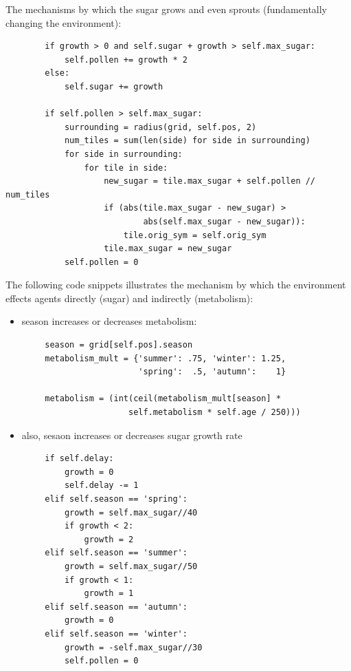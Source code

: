 \noindent
The mechanisms by which the sugar grows and even sprouts (fundamentally changing the environment):
\begin{verbatim}
        if growth > 0 and self.sugar + growth > self.max_sugar:
            self.pollen += growth * 2
        else:
            self.sugar += growth
            
        if self.pollen > self.max_sugar:
            surrounding = radius(grid, self.pos, 2)
            num_tiles = sum(len(side) for side in surrounding)
            for side in surrounding:
                for tile in side:
                    new_sugar = tile.max_sugar + self.pollen // num_tiles
                    if (abs(tile.max_sugar - new_sugar) > 
                            abs(self.max_sugar - new_sugar)):
                        tile.orig_sym = self.orig_sym                        
                    tile.max_sugar = new_sugar
            self.pollen = 0
\end{verbatim}

The following code snippets illustrates the mechanism by which the environment effects agents directly (sugar) and indirectly (metabolism):

\begin{itemize}
    \item season increases or decreases metabolism:
\end{itemize}
\begin{verbatim}
        season = grid[self.pos].season
        metabolism_mult = {'summer': .75, 'winter': 1.25, 
                           'spring':  .5, 'autumn':    1}
        
        metabolism = (int(ceil(metabolism_mult[season] * 
                         self.metabolism * self.age / 250)))
\end{verbatim}
\begin{itemize}
    \item also, sesaon increases or decreases sugar growth rate
\end{itemize}
\begin{verbatim}
        if self.delay:
            growth = 0
            self.delay -= 1            
        elif self.season == 'spring':
            growth = self.max_sugar//40
            if growth < 2:
                growth = 2
        elif self.season == 'summer': 
            growth = self.max_sugar//50 
            if growth < 1:
                growth = 1
        elif self.season == 'autumn':
            growth = 0
        elif self.season == 'winter':
            growth = -self.max_sugar//30
            self.pollen = 0
\end{verbatim}

